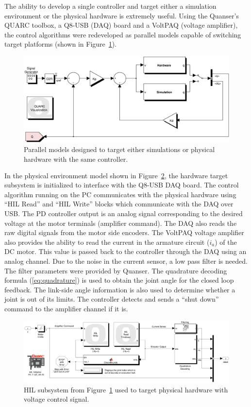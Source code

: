 The ability to develop a single controller and target either a simulation environment or the physical hardware is extremely useful. Using the Quanser's QUARC toolbox, a Q8-USB (DAQ) board and a VoltPAQ (voltage amplifier), the control algorithms were redeveloped as parallel models capable of switching target platforms (shown in Figure~\ref{fig:parallelmodels}).

\begin{figure}[!t]
	\centering
    \includegraphics[scale=0.6]{fig/experiments/parallelmodels.eps} 
  	\caption{Parallel models designed to target either simulations or physical hardware with the same controller.}
	\label{fig:parallelmodels}
\end{figure}

In the physical environment model shown in Figure~\ref{fig:hilmodel}, the hardware target subsystem is initialized to interface with the Q8-USB DAQ board. The control algorithm running on the PC communicates with the physical hardware using ``HIL Read'' and ``HIL Write'' blocks which communicate with the DAQ over USB. The PD controller output is an analog signal corresponding to the desired voltage at the motor terminals (amplifier command). The DAQ also reads the raw digital signals from the motor side encoders. The VoltPAQ voltage amplifier also provides the ability to read the current in the armature circuit ($i_a$) of the DC motor. This value is passed back to the controller through the DAQ using an analog channel. Due to the noise in the current sensor, a low pass filter is needed. The filter parameters were provided by Quanser. The quadrature decoding formula (\ref{eq:quadrature}) is used to obtain the joint angle for the closed loop feedback. The link-side angle information is also used to determine whether a joint is out of its limits. The controller detects and sends a ``shut down'' command to the amplifier channel if it is. 

\begin{figure}[!t]
	\centering
    \includegraphics[scale=0.5]{fig/experiments/hilmodel.eps} 
  	\caption{HIL subsystem from Figure~\ref{fig:parallelmodels} used to target physical hardware with voltage control signal.}
	\label{fig:hilmodel}
\end{figure}

